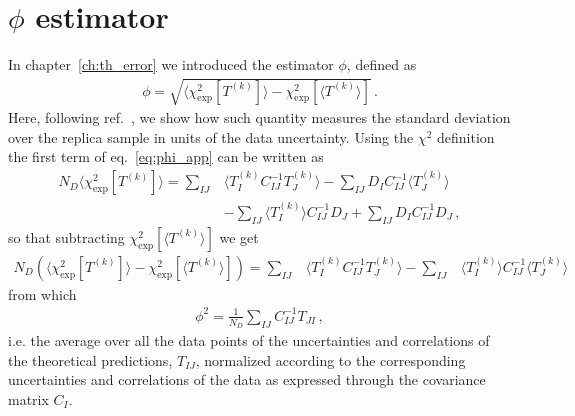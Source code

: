 \section{$\phi$ estimator}
\label{app:phi}
In chapter~\ref{ch:th_error} we introduced the estimator $\phi$, defined as 
\begin{align}
    \label{eq:phi_app}
    \phi = \sqrt{\langle \chi^2_{\text{exp}}\left[T^{(k)}\right] \rangle - \chi^2_{\text{exp}}\left[\langle T^{(k)} \rangle\right]}\,.
\end{align}
Here, following ref.~\cite{Ball:2014uwa}, we show how such quantity measures the standard
deviation over the replica sample in units of the data uncertainty.
%
Using the $\chi^2$ definition the first term of eq.~\ref{eq:phi_app} can be written as
\begin{align}
    N_D \langle \chi^2_{\text{exp}}\left[T^{(k)}\right] \rangle = 
     \sum_{IJ}& \langle T^{(k)}_I  C_{IJ}^{-1} T^{(k)}_J \rangle  -  \sum_{IJ} D_I C_{IJ}^{-1} \langle T^{(k)}_J  \rangle
     \nonumber \\ &-  \sum_{IJ} \langle T^{(k)}_I \rangle C_{IJ}^{-1} D_J  
     + \sum_{IJ} D_I C_{IJ}^{-1} D_J\,,
\end{align}
so that subtracting $\chi^2_{\text{exp}}\left[\langle T^{(k)} \rangle\right]$ we get
\begin{align}
    N_D \left(\langle \chi^2_{\text{exp}}\left[T^{(k)}\right] \rangle 
    - \chi^2_{\text{exp}}\left[ \langle T^{(k)} \rangle \right]\right) =
    \sum_{IJ}& \langle T^{(k)}_I  C_{IJ}^{-1} T^{(k)}_J \rangle 
    - \sum_{IJ}& \langle T^{(k)}_I\rangle  C_{IJ}^{-1} \langle T^{(k)}_J \rangle
\end{align}
from which 
\begin{align}
    \phi^2 = \frac{1}{N_D}\sum_{IJ} C^{-1}_{IJ}T_{JI}\,,
\end{align}
i.e. the average over all the data points of the uncertainties and correlations of the theoretical
predictions, $T_{IJ}$, normalized according to the corresponding uncertainties and correlations of the
data as expressed through the covariance matrix $C_{I}$.